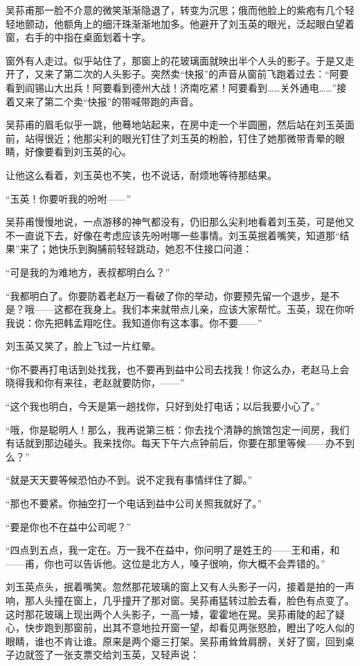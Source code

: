 \par 吴荪甫那一脸不介意的微笑渐渐隐退了，转变为沉思；俄而他脸上的紫疱有几个轻轻地颤动，他额角上的细汗珠渐渐地加多。他避开了刘玉英的眼光，泛起眼白望着窗，右手的中指在桌面划着十字。
\par 窗外有人走过。似乎站住了，那窗上的花玻璃面就映出半个人头的影子。于是又走开了，又来了第二次的人头影子。突然卖“快报”的声音从窗前飞跑着过去：“阿要看到阎锡山大出兵！阿要看到德州大战！济南吃紧！阿要看到……关外通电……”接着又来了第二个卖“快报”的带喊带跑的声音。
\par 吴荪甫的眉毛似乎一跳，他蓦地站起来，在房中走一个半圆圈，然后站在刘玉英面前，站得很近；他那尖利的眼光钉住了刘玉英的粉脸，钉住了她那微带青晕的眼睛，好像要看到刘玉英的心。
\par 让他这么看着，刘玉英也不笑，也不说话，耐烦地等待那结果。
\par “玉英！你要听我的吩咐——”
\par 吴荪甫慢慢地说，一点游移的神气都没有，仍旧那么尖利地看着刘玉英，可是他又不一直说下去，好像在考虑应该先吩咐哪一些事情。刘玉英抿着嘴笑，知道那“结果”来了；她快乐到胸脯前轻轻跳动，她忍不住接口问道：
\par “可是我的为难地方，表叔都明白么？”
\par “我都明白了。你要防着老赵万一看破了你的举动，你要预先留一个退步，是不是？哦——这都在我身上。我们本来就带点儿亲，应该大家帮忙。玉英，现在你听我说：你先把韩孟翔吃住。我知道你有这本事。你不要——”
\par 刘玉英又笑了，脸上飞过一片红晕。
\par “你不要再打电话到处找我，也不要再到益中公司去找我！你这么办，老赵马上会晓得我和你有来往，老赵就要防你，——”
\par “这个我也明白，今天是第一趟找你，只好到处打电话；以后我要小心了。”
\par “哦，你是聪明人！那么，我再说第三桩：你去找个清静的旅馆包定一间房，我们有话就到那边碰头。我来找你。每天下午六点钟前后，你要在那里等候——办不到么？”
\par “就是天天要等候恐怕办不到。说不定我有事情绊住了脚。”
\par “那也不要紧。你抽空打一个电话到益中公司关照我就好了。”
\par “要是你也不在益中公司呢？”
\par “四点到五点，我一定在。万一我不在益中，你问明了是姓王的——王和甫，和——甫，你也可以告诉他。这位是北方人，嗓子很响，你大概不会弄错的。”
\par 刘玉英点头，抿着嘴笑。忽然那花玻璃的窗上又有人头影子一闪，接着是拍的一声响，那人头撞在窗上，几乎撞开了那对窗。吴荪甫猛转过脸去看，脸色有点变了。这时那花玻璃上现出两个人头影子，一高一矮，霍霍地在晃。吴荪甫陡的起了疑心，快步跑到那窗前，出其不意地拉开窗一望，却看见两张怒脸，瞪出了吃人似的眼睛，谁也不肯让谁。原来是两个瘪三打架。吴荪甫耸耸肩膀，关好了窗，回到桌子边就签了一张支票交给刘玉英，又轻声说：
